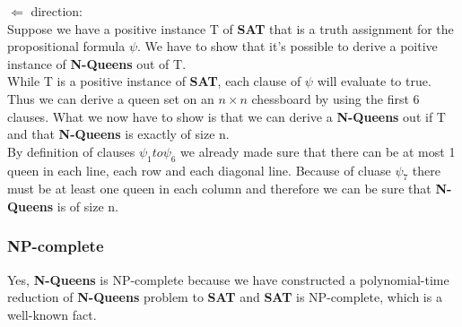 \noindent $\Leftarrow$ direction:\\
Suppose we have a positive instance T of \textbf{SAT} that is a truth assignment for the propositional
formula $\psi$. We have to show that it's possible to derive a poitive instance of 
\textbf{N-Queens} out of T.\\
While T is a positive instance of \textbf{SAT}, each clause of $\psi$ will evaluate 
to true. Thus we can derive a queen set on an $n \times n$ chessboard by using the 
first 6 clauses. What we now have to show is that we can derive a \textbf{N-Queens}
out if T and that \textbf{N-Queens} is exactly of size n.\\
By definition of clauses $\psi_1 to \psi_6$ we already made sure that there can be at
most 1 queen in each line, each row and each diagonal line. Because of cluase 
$\psi_7$ there must be at least one queen in each column and therefore we can be sure
that \textbf{N-Queens} is of size n.

\subsubsection{NP-complete}
Yes, \textbf{N-Queens} is NP-complete because we have constructed a polynomial-time 
reduction of \textbf{N-Queens} problem to \textbf{SAT} and \textbf{SAT} is NP-complete, 
which is a well-known fact.
